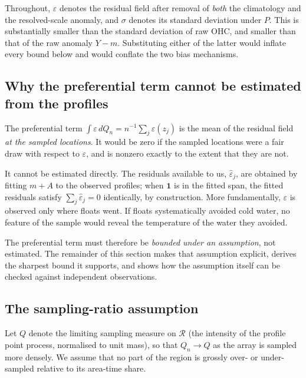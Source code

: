 \begin{remark}
\label{rem:sigma-definition}
Throughout, $\varepsilon$ denotes the residual field after removal of \emph{both} the
climatology and the resolved-scale anomaly, and $\sigma$ denotes its standard deviation under
$P$. This is substantially smaller than the standard deviation of raw OHC, and smaller than
that of the raw anomaly $Y - m$. Substituting either of the latter would inflate every bound
below and would conflate the two bias mechanisms.
\end{remark}

\subsection{Why the preferential term cannot be estimated from the profiles}
\label{sec:not-estimable}

The preferential term $\int \varepsilon\, dQ_n = n^{-1}\sum_j \varepsilon(z_j)$ is the mean of
the residual field \emph{at the sampled locations}. It would be zero if the sampled locations
were a fair draw with respect to $\varepsilon$, and is nonzero exactly to the extent that they
are not.

It cannot be estimated directly. The residuals available to us, $\hat\varepsilon_j$, are
obtained by fitting $m + A$ to the observed profiles; when $\mathbf{1}$ is in the fitted span,
the fitted residuals satisfy $\sum_j \hat\varepsilon_j = 0$ identically, by construction. More
fundamentally, $\varepsilon$ is observed only where floats went. If floats systematically
avoided cold water, no feature of the sample would reveal the temperature of the water they
avoided.

The preferential term must therefore be \emph{bounded under an assumption}, not estimated. The
remainder of this section makes that assumption explicit, derives the sharpest bound it
supports, and shows how the assumption itself can be checked against independent observations.

\subsection{The sampling-ratio assumption}
\label{sec:lambda}

Let $Q$ denote the limiting sampling measure on $\mathcal{R}$ (the intensity of the profile
point process, normalised to unit mass), so that $Q_n \to Q$ as the array is sampled more
densely. We assume that no part of the region is grossly over- or under-sampled relative to
its area-time share.

